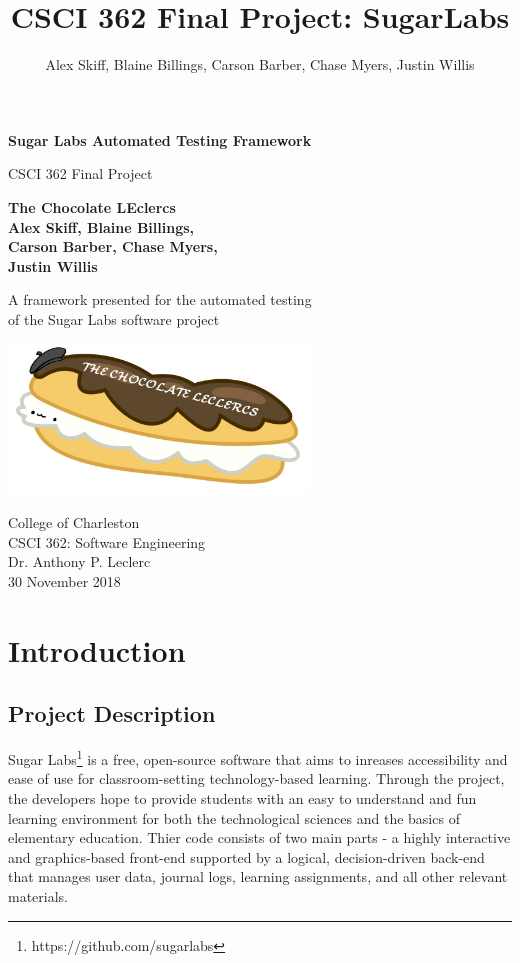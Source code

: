 \documentclass{article}
\title{CSCI 362 Final Project: SugarLabs}
\author{Alex Skiff, Blaine Billings, Carson Barber, Chase Myers, Justin Willis}
\date{ }
\begin{document}
\begin{titlepage}
    \begin{center}
        \vspace*{1cm}
 
        \Huge
        \textbf{Sugar Labs Automated Testing Framework}
 
        \vspace{0.5cm}
        \LARGE
        CSCI 362 Final Project
 
        \vspace{1.5cm}
 
		\textbf{The Chocolate LEclercs}\\
        \textbf{Alex Skiff, Blaine Billings,}\\
        \textbf{Carson Barber, Chase Myers,}\\
        \textbf{Justin Willis}
 
        \vfill
 
        A framework presented for the automated testing\\
        of the Sugar Labs software project
 
        \vspace{0.8cm}
 
		\includegraphics[width=0.6\textwidth]{../imgs/ChocolateLEclercs.png}

        \Large
        College of Charleston\\
        CSCI 362: Software Engineering\\
        Dr. Anthony P. Leclerc\\
        30 November 2018
 
    \end{center}
\end{titlepage}
 
\tableofcontents

\newpage

\section{Introduction}
\subsection{Project Description}
Sugar Labs\footnote{https://github.com/sugarlabs} is a free, open-source software that aims to inreases accessibility and ease of use for classroom-setting technology-based learning. Through the project, the developers hope to provide students with an easy to understand and fun learning environment for both the technological sciences and the basics of elementary education. Thier code consists of two main parts - a highly interactive and graphics-based front-end supported by a logical, decision-driven back-end that manages user data, journal logs, learning assignments, and all other relevant materials.
\end{document}
